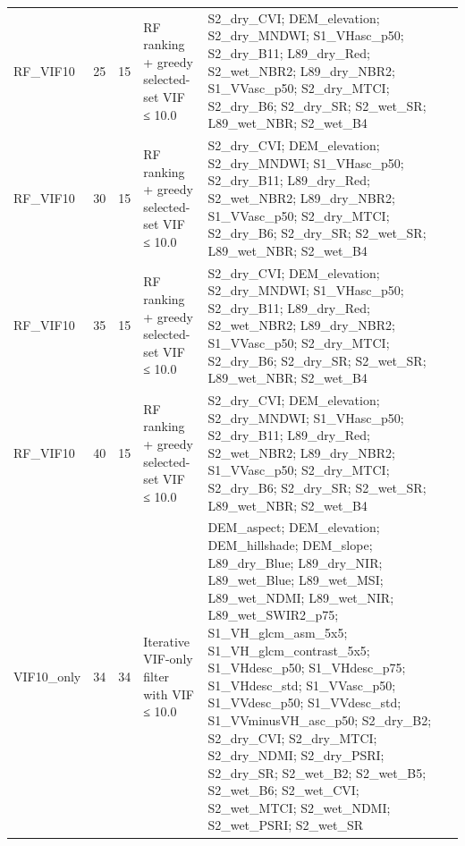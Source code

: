 \begin{tabular}{lrrll}
RF_VIF10 & 25 & 15 & RF ranking + greedy selected-set VIF ≤ 10.0 & S2_dry_CVI; DEM_elevation; S2_dry_MNDWI; S1_VHasc_p50; S2_dry_B11; L89_dry_Red; S2_wet_NBR2; L89_dry_NBR2; S1_VVasc_p50; S2_dry_MTCI; S2_dry_B6; S2_dry_SR; S2_wet_SR; L89_wet_NBR; S2_wet_B4 \\
RF_VIF10 & 30 & 15 & RF ranking + greedy selected-set VIF ≤ 10.0 & S2_dry_CVI; DEM_elevation; S2_dry_MNDWI; S1_VHasc_p50; S2_dry_B11; L89_dry_Red; S2_wet_NBR2; L89_dry_NBR2; S1_VVasc_p50; S2_dry_MTCI; S2_dry_B6; S2_dry_SR; S2_wet_SR; L89_wet_NBR; S2_wet_B4 \\
RF_VIF10 & 35 & 15 & RF ranking + greedy selected-set VIF ≤ 10.0 & S2_dry_CVI; DEM_elevation; S2_dry_MNDWI; S1_VHasc_p50; S2_dry_B11; L89_dry_Red; S2_wet_NBR2; L89_dry_NBR2; S1_VVasc_p50; S2_dry_MTCI; S2_dry_B6; S2_dry_SR; S2_wet_SR; L89_wet_NBR; S2_wet_B4 \\
RF_VIF10 & 40 & 15 & RF ranking + greedy selected-set VIF ≤ 10.0 & S2_dry_CVI; DEM_elevation; S2_dry_MNDWI; S1_VHasc_p50; S2_dry_B11; L89_dry_Red; S2_wet_NBR2; L89_dry_NBR2; S1_VVasc_p50; S2_dry_MTCI; S2_dry_B6; S2_dry_SR; S2_wet_SR; L89_wet_NBR; S2_wet_B4 \\
VIF10_only & 34 & 34 & Iterative VIF-only filter with VIF ≤ 10.0 & DEM_aspect; DEM_elevation; DEM_hillshade; DEM_slope; L89_dry_Blue; L89_dry_NIR; L89_wet_Blue; L89_wet_MSI; L89_wet_NDMI; L89_wet_NIR; L89_wet_SWIR2_p75; S1_VH_glcm_asm_5x5; S1_VH_glcm_contrast_5x5; S1_VHdesc_p50; S1_VHdesc_p75; S1_VHdesc_std; S1_VVasc_p50; S1_VVdesc_p50; S1_VVdesc_std; S1_VVminusVH_asc_p50; S2_dry_B2; S2_dry_CVI; S2_dry_MTCI; S2_dry_NDMI; S2_dry_PSRI; S2_dry_SR; S2_wet_B2; S2_wet_B5; S2_wet_B6; S2_wet_CVI; S2_wet_MTCI; S2_wet_NDMI; S2_wet_PSRI; S2_wet_SR \\
\bottomrule
\end{tabular}
